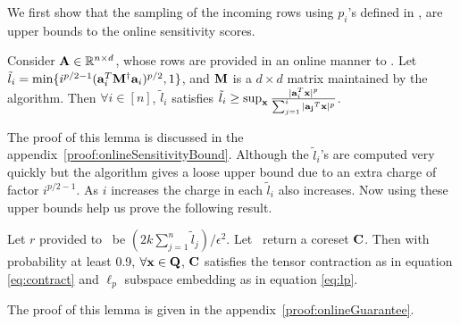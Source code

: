 We first show that the sampling of the incoming rows using $p_{i}$'s defined in \online, are upper bounds to the online sensitivity scores. 
% 
\begin{lemma}{\label{lemma:onlineSensitivityBound}}
 Consider $\mathbf{A} \in \mathbb{R}^{n \times d}$, whose rows are provided in an online manner to \online. Let $\tilde{l}_i = \min\{i^{p/2-1}(\mathbf{a}_{i}^T\mathbf{M}^{\dagger}\mathbf{a}_{i})^{p/2},1\}$, and $\mathbf{M}$ is a $d \times d$ matrix maintained by the algorithm. Then $\forall i \in [n]$,  $\tilde{l}_i$ satisfies $\tilde{l}_i \ge \sup_{\mathbf{x}}\frac{|\mathbf{a}_{i}^T\mathbf{x}|^{p}}{\sum_{j=1}^{i}|\mathbf{a_{j}}^T\mathbf{x}|^{p}}$.     
\end{lemma}
The proof of this lemma is discussed in the appendix~\ref{proof:onlineSensitivityBound}. Although the $\tilde{l}_{i}$'s are computed very quickly but the algorithm gives a loose upper bound due to an extra charge of factor $i^{p/2-1}$. As $i$ increases the charge in each $\tilde{l}_{i}$ also increases. Now using these upper bounds help us prove the following result.
\begin{lemma}{\label{lemma:onlineGuarantee}}
Let $r$ provided to \online~be 
$(2k\sum_{j=1}^{n}\tilde{l}_{j})/\epsilon^{2}$. Let \online~return a coreset $\mathbf{C}$. Then with probability at least 0.9, $\forall \mathbf{x} \in \mathbf{Q}$, 
$\mathbf{C}$ satisfies the tensor contraction as in equation \eqref{eq:contract} and $\ell_{p}$ subspace embedding as in equation \eqref{eq:lp}.
\end{lemma}
The proof of this lemma is given in the appendix~\ref{proof:onlineGuarantee}. 
% 
